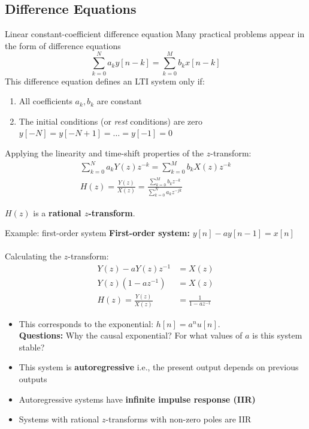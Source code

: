 \documentclass[10pt]{beamer}
\begin{document}
\subsection{Difference Equations}
%
\begin{frame}{Linear constant-coefficient difference equation}
	Many practical problems appear in the form of difference equations
	\begin{equation*}
		\sum_{k=0}^N a_k y[n-k] = \sum_{k=0}^Mb_k x[n-k]
	\end{equation*}
	\pause This difference equation defines an LTI system only if:
	\begin{enumerate}
		\item All coefficients $a_k, b_k$ are constant
		\item The initial conditions (or \textit{rest} conditions) are zero $y[-N] = y[-N+1] =\ldots=y[-1] = 0$
	\end{enumerate}	 
	
	\pause Applying the linearity and time-shift properties of the $z$-transform:
	\begin{align*}
		\sum_{k=0}^N a_kY(z)z^{-k} = \sum_{k=0}^M b_kX(z)z^{-k} \\
		H(z) = \frac{Y(z)}{X(z)} = \frac{\sum_{k=0}^M b_kz^{-k}}{\sum_{k=0}^N a_kz^{-jk}}
	\end{align*}
	
	$H(z)$ is a \textbf{rational $z$-transform}.
\end{frame}

\begin{frame}{Example: first-order system}
	\textbf{First-order system:} $y[n] - ay[n-1] = x[n]$
	~\\
	~\\
	Calculating the $z$-transform:
	\begin{align*}
	Y(z) - aY(z)z^{-1} &= X(z) \\
	Y(z)(1 - az^{-1}) &= X(z) \\
	H(z) = \frac{Y(z)}{X(z)} &= \frac{1}{1 - az^{-1}} 
	\end{align*}
	
	\begin{itemize}
		\pause\item This corresponds to the exponential: $h[n] = a^nu[n]$.\\ \textbf{Questions:} Why the causal exponential? 
		For what values of $a$ is this system stable?
		\pause\item This system is \textbf{autoregressive} i.e., the present output depends on previous outputs
		\pause\item Autoregressive systems have \textbf{infinite impulse response (IIR)}
		\pause\item Systems with rational $z$-transforms with non-zero poles are IIR
	\end{itemize}
	
\end{frame}
\end{document}
